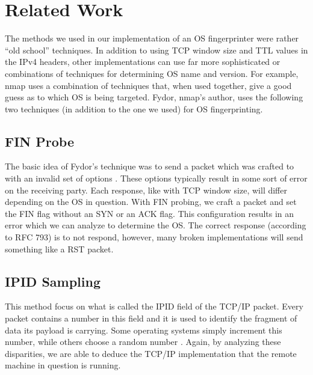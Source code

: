 \section{Related Work}

The methods we used in our implementation of an OS fingerprinter were rather ``old school'' techniques. In addition to using TCP window size and TTL values in the IPv4 headers, other implementations can use far more sophisticated or combinations of techniques for determining OS name and version.  For example, nmap uses a combination of techniques that, when used together, give a good guess as to which OS is being targeted.  Fydor, nmap's author, uses the following two techniques (in addition to the one we used) for OS fingerprinting. 

\subsection{FIN Probe}

The basic idea of Fydor's technique was to send a packet which was crafted to with an invalid set of options \cite{defeating_nmap}.  These options typically result in some sort of error on the receiving party.  Each response, like with TCP window size, will differ depending on the OS in question.  With FIN probing, we craft a packet and set the FIN flag without an SYN or an ACK flag.  This configuration results in an error which we can analyze to determine the OS.  The correct response (according to RFC 793) is to not respond, however, many broken implementations will send something like a RST packet.

\subsection{IPID Sampling}

This method focus on what is called the IPID field of the TCP/IP packet.  Every packet contains a number in this field and it is used to identify the fragment of data its payload is carrying.  Some operating systems simply increment this number, while others choose a random number \cite{defeating_nmap}.  Again, by analyzing these disparities, we are able to deduce the TCP/IP implementation that the remote machine in question is running.